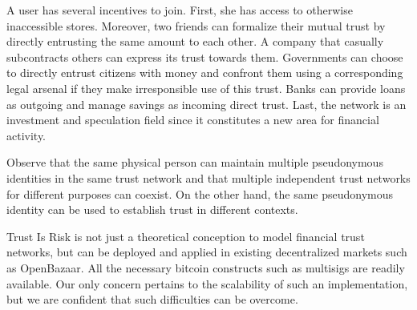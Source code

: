   A user has several incentives to join. First, she has access to otherwise inaccessible stores. Moreover, two friends can
  formalize their mutual trust by directly entrusting the same amount to each other. A company that casually subcontracts
  others can express its trust towards them. Governments can choose to directly entrust citizens with money and confront them
  using a corresponding legal arsenal if they make irresponsible use of this trust. Banks can provide loans as outgoing and
  manage savings as incoming direct trust. Last, the network is an investment and speculation field since it constitutes a new
  area for financial activity.

  Observe that the same physical person can maintain multiple pseudonymous identities in the same trust network and that
  multiple independent trust networks for different purposes can coexist. \ifdefined\proceedings \else On the other hand, the
  same pseudonymous identity can be used to establish trust in different contexts.\fi
  
  Trust Is Risk is not just a theoretical conception to model financial trust networks, but can be deployed and applied in
  existing decentralized markets such as OpenBazaar. All the necessary bitcoin constructs such as multisigs are readily
  available. Our only concern pertains to the scalability of such an implementation, but we are confident that such
  difficulties can be overcome.

